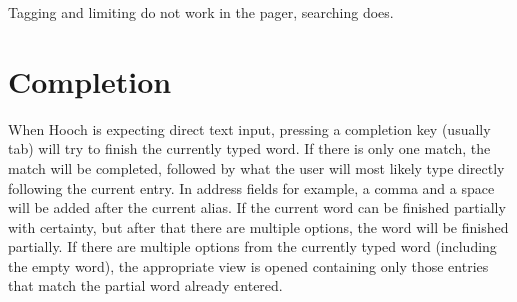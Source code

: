 \documentclass[a4paper]{book}
\begin{document}
Tagging and limiting do not work in the pager, searching does.


\section{Completion}

When Hooch is expecting direct text input, pressing a completion key (usually
tab) will try to finish the currently typed word. If there is only one match,
the match will be completed, followed by what the user will most likely type
directly following the current entry. In address fields for example, a comma
and a space will be added after the current alias. If the current word can
be finished partially with certainty, but after that there are multiple
options, the word will be finished partially. If there are multiple options
from the currently typed word (including the empty word), the appropriate
view is opened containing only those entries that match the partial word
already entered.
\end{document}
